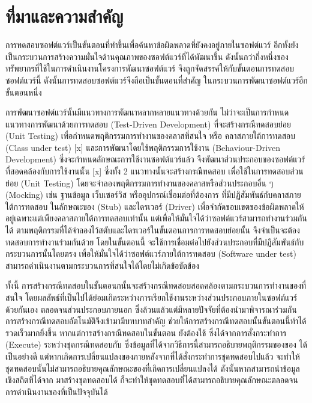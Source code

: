 \section{ที่มาและความสำคัญ} 
\label{sec:introduction}

การทดสอบซอฟต์แวร์เป็นขั้นตอนที่ทำขึ้นเพื่อค้นหาข้อผิดพลาดที่ยังคงอยู่ภายในซอฟต์แวร์ \cite{Myers:2011:AST:983238} 
อีกทั้งยังเป็นกระบวนการสร้างความมั่นใจด้านคุณภาพของซอฟต์แวร์ที่ได้พัฒนาขึ้น ดังนั้นกว่ากึ่งหนึ่งของทรัพยากรที่ใช้ในการดำเนินงานโครงการพัฒนาซอฟต์แวร์
จึงถูกจัดสรรค์ให้กับขั้นตอนการทดสอบซอฟต์แวร์นี้ \cite{Jackson2007, Tassey2002} ดังนั้นการทดสอบซอฟต์แวร์จึงถือเป็นขั้นตอนที่สำคัญ
ในกระบวนการพัฒนาซอฟต์แวร์อีกขั้นตอนหนึ่ง

การพัฒนาซอฟต์แวร์นั้นมีแนวทางการพัฒนาหลากหลายแนวทางด้วยกัน ไม่ว่าจะเป็นการกำหนดแนวทางการพัฒนาด้วยการทดสอบ (Test-Driven Development) 
ที่จะสร้างกรณีทดสอบย่อย (Unit Testing) เพื่อกำหนดพฤติกรรมการทำงานของคลาสที่สนใจ หรือ คลาสภายใต้การทดสอบ (Class under test) [x]
และการพัฒนาโดยใช้พฤติกรรมการใช้งาน (Behaviour-Driven Development) ซึ่งจะกำหนดลักษณะการใช้งานซอฟต์แวร์แล้ว
จึงพัฒนาส่วนประกอบของซอฟต์แวร์ที่สอดคล้องกับการใช้งานนั้น [x] 
ซึ่งทั้ง 2 แนวทางนั้นจะสร้างกรณีทดสอบ เพื่อใช้ในการทดสอบส่วนย่อย (Unit Testing) โดยจะจำลองพฤติกรรมการทำงานของคลาสหรือส่วนประกอบอื่น ๆ
(Mocking) เช่น ฐานข้อมูล เว็บเซอร์วิส หรืออุปกรณ์เชื่อมต่อที่ต้องการ ที่มีปฏิสัมพันธ์กับคลาสภายใต้การทดสอบ ในลักษณะของ (Stub) และไดรเวอร์ (Driver)
เพื่อจำกัดขอบเขตของข้อผิดพลาดให้อยู่เฉพาะแต่เพียงคลาสภายใต้การทดสอบเท่านั้น แต่เพื่อให้มั่นใจได้ว่าซอฟต์แวร์สามารถทำงานร่วมกันได้ 
ตามพฤติกรรมที่ได้จำลองไว้สตับและไดรเวอร์ในขั้นตอนการการทดสอบย่อยนั้น 
จึงจำเป็นจะต้องทดสอบการทำงานร่วมกันด้วย\FirstTimeDefine{\IntegrationTesting}{\IntegrationTestingEN}
โดยในขั้นตอนนี้ จะใช้การเชื่อมต่อไปยังส่วนประกอบที่มีปฏิสัมพันธ์กับกระบวนการนั้นโดยตรง เพื่อให้มั่นใจได้ว่าซอฟต์แวร์ภายใต้การทดสอบ (Software under test) 
สามารถดำเนินงานตามกระบวนการที่สนใจได้โดยไม่เกิดข้อขัดข้อง

ทั้งนี้ การสร้างกรณีทดสอบในขั้นตอนก{\IntegrationTesting}นั้นจะสร้างกรณีทดสอบสอดคล้องตามกระบวนการทำงานของ{\SUT}ที่สนใจ 
โดยผลลัพธ์ที่เป็นไปได้ย่อมเกิดระหว่างการเรียกใช้งานระหว่างส่วนประกอบภายในซอฟต์แวร์{\SUT}ด้วยกันเอง ตลอดจนส่วนประกอบภายนอก 
ซึ่งล้วนแล้วแต่มีหลายปัจจัยที่ต้องนำมาพิจารณาร่วมกัน การสร้างกรณีทดสอบอัตโนมัติจึงเข้ามามีบทบาทสำคัญ ช่วยให้การสร้างกรณีทดสอบนั้นขั้นตอนนี้ทำได้รวดเร็วมากยิ่งขึ้น 
หากแต่การสร้างกรณีทดสอบในขั้นตอน{\IntegrationTesting} ยังต้องใช้\FirstTimeDefine{\DynamicInformation}{\DynamicInformationEN}
ซึ่งได้จากการสั่งกระทำการ (Execute) ระหว่างชุดกรณีทดสอบกับ{\sourcecode} ซึ่งข้อมูลที่ได้จากวิธีการนี้สามารถอธิบายพฤติกรรมของ{\SUT}ของ{\sourcecode}
ได้เป็นอย่างดี แต่หากเกิดการเปลี่ยนแปลงของ{\sourcecode}ภายหลังจากที่ได้สั่งกระทำการชุดทดสอบไปแล้ว 
จะทำให้ชุดทดสอบนั้นไม่สามารถอธิบายคุณลักษณะของ{\sourcecode}ที่เกิดการเปลี่ยนแปลงได้ ดังนั้นหากสามารถนำข้อมูลเชิงสถิตที่ได้จาก{\sourcecode}
มาสร้างชุดทดสอบได้ ก็จะทำให้ชุดทดสอบที่ได้สามารถอธิบายคุณลักษณะตลอดจนการดำเนินงานของ{\SUT}ที่เป็นปัจจุบันได้

